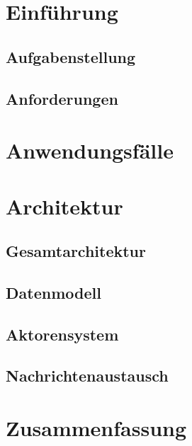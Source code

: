\section{Einführung}\label{sec:intro} %


    \subsection{Aufgabenstellung}\label{sec:task_definition} %
    

    \subsection{Anforderungen}\label{sec:requirements} %
    

\newpage
\section{Anwendungsfälle}\label{sec:use_cases} %


\newpage
\section{Architektur}\label{sec:architecture} %


    \subsection{Gesamtarchitektur}\label{sec:overall_architecture} %
    

    \subsection{Datenmodell}\label{sec:data_model}
    

    \subsection{Aktorensystem}\label{sec:actor_system} %
    

    \subsection{Nachrichtenaustausch}\label{sec:message_exchange} %
    

\newpage
\section{Zusammenfassung}\label{sec:conclusion} %

